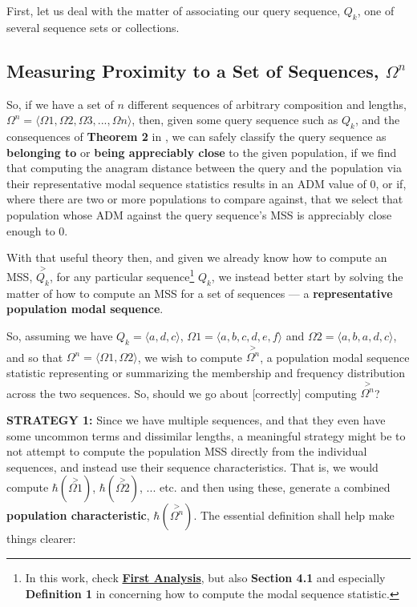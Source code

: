 \documentclass[a4paper, 18pt]{book} %
\begin{document}
First, let us deal with the matter of associating our query sequence, $Q_k$, one of several sequence sets or collections.

\subsection{Measuring Proximity to a Set of Sequences, $\Omega^n$}
\label{SECPROXPOP}

So, if we have a set of $n$ different sequences of arbitrary composition and lengths, $\Omega^n = \langle \Omega1, \Omega2, \Omega3,..., \Omega n \rangle$, then, given some query sequence such as $Q_k$, and the consequences of \textbf{Theorem 2} in \cite{transformatics}, we can safely classify the query sequence as \textbf{belonging to} or \textbf{being appreciably close} to the given population, if we find that computing the anagram distance between the query and the population via their representative modal sequence statistics results in an ADM value of 0, or if, where there are two or more populations to compare against, that we select that population whose ADM against the query sequence's MSS is appreciably close enough to 0.

With that useful theory then, and given we already know how to compute an MSS, $\overset{>}{Q_k}$, for any particular sequence\footnote{In this work, check \textbf{\hyperref[SECFANAL]{First Analysis}}, but also \textbf{Section 4.1} and especially \textbf{Definition 1} in \cite{transformatics} concerning how to compute the modal sequence statistic.} $Q_k$, we instead better start by solving the matter of how to compute an MSS for a set of sequences --- a \textbf{representative population modal sequence}.


So, assuming we have $Q_k = \langle a, d, c \rangle$, $\Omega1 = \langle a, b, c, d, e, f \rangle$ and $\Omega2 = \langle a, b, a, d, c \rangle$, and so that $\Omega^n = \langle \Omega1, \Omega2 \rangle$, we wish to compute $\overset{>}{\Omega^n}$, a population modal sequence statistic representing or summarizing the membership and frequency distribution across the two sequences. So, should we go about [correctly] computing $\overset{>}{\Omega^n}$?

\textbf{STRATEGY 1:} Since we have multiple sequences, and that they even have some uncommon terms and dissimilar lengths, a meaningful strategy might be to not attempt to compute the population MSS directly from the individual sequences, and instead use their sequence characteristics. That is, we would compute $\hbar(\overset{>}{\Omega1})$, $\hbar(\overset{>}{\Omega2})$, ... etc. and then using these, generate a combined \textbf{population characteristic}, $\hbar(\overset{>}{\Omega^n})$. The essential definition shall help make things clearer:\\
\end{document}
